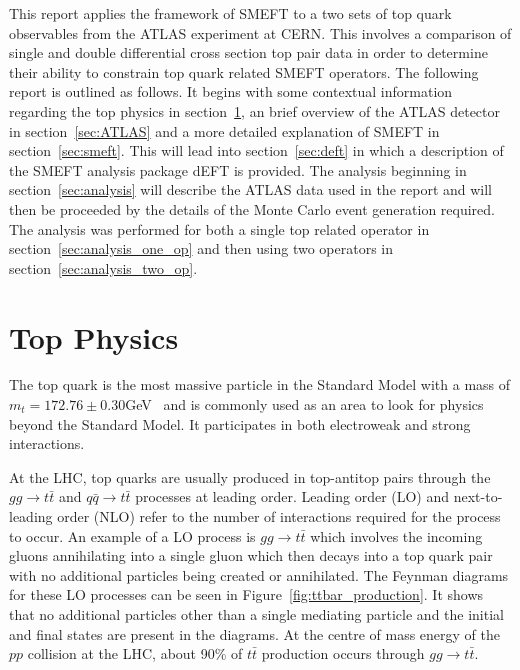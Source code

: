 \documentclass[a4paper,11pt]{article}
\begin{document}
This report applies the framework of SMEFT to a two sets of top quark observables from the ATLAS experiment at CERN.
This involves a comparison of single and double differential cross section top pair data in order to determine their ability to constrain top quark related SMEFT operators.
The following report is outlined as follows.
It begins with some contextual information regarding the top physics in section~\ref{sec:topquarks}, an brief overview of the ATLAS detector in section~\ref{sec:ATLAS} and a more detailed explanation of SMEFT in section~\ref{sec:smeft}.
This will lead into section~\ref{sec:deft} in which a description of the SMEFT analysis package dEFT is provided.
The analysis beginning in section~\ref{sec:analysis} will describe the ATLAS data used in the report and will then be proceeded by the details of the Monte Carlo event generation required.
The analysis was performed for both a single top related operator in section~\ref{sec:analysis_one_op} and then using two operators in section~\ref{sec:analysis_two_op}.

\section{Top Physics}\label{sec:topquarks}

The top quark is the most massive particle in the Standard Model with a mass of $m_{t} =172.76\pm0.30$GeV~\cite{ParticleDataGroup:2020ssz} and is commonly used as an area to look for physics beyond the Standard Model.
It participates in both electroweak and strong interactions.

At the LHC, top quarks are usually produced in top-antitop pairs through the $gg\rightarrow t\bar{t}$ and $q\bar{q}\rightarrow t\bar{t}$ processes at leading order.
Leading order (LO) and next-to-leading order (NLO) refer to the number of interactions required for the process to occur.
An example of a LO process is $gg\rightarrow t\bar{t}$ which involves the incoming gluons annihilating into a single gluon which then decays into a top quark pair with no additional particles being created or annihilated.
The Feynman diagrams for these LO processes can be seen in Figure~\ref{fig:ttbar_production}.
It shows that no additional particles other than a single mediating particle and the initial and final states are present in the diagrams.
At the centre of mass energy of the $pp$ collision at the LHC, about 90\% of $t\bar{t}$ production occurs through $gg\rightarrow t\bar{t}$.
\end{document}

